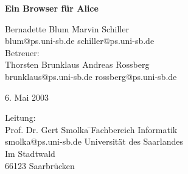 \documentclass[12pt,a4paper]{article}
\begin{document}

\begin{titlepage}

\vspace*{\fill}
\begin{center}
\LARGE{\bf{Ein Browser f\"{u}r Alice}}
\end{center}

\vspace{1cm}

\begin{center}
  \begin{minipage}[center]{10cm}
    \begin{tabbing} 
      Bernadette Blum \hspace{1cm}\= Marvin Schiller\\
      \small{blum@ps.uni-sb.de} \> \small{schiller@ps.uni-sb.de} \\[1cm]

      Betreuer: \\[2mm]
      Thorsten Brunklaus \> Andreas Rossberg \\
      \small{brunklaus@ps.uni-sb.de} \> \small{rossberg@ps.uni-sb.de}

    \end{tabbing}
  \end{minipage}
\end{center}

\vspace{5mm}
\begin{center}
\Large{6. Mai 2003}
\end{center}

\vspace{8mm}

\begin{center}
  \begin{minipage}[center]{15cm}
    \begin{tabbing}
     Leitung: \\
     Prof. Dr. Gert Smolka \hspace{1cm}\= \small Fachbereich Informatik \\ 
    \small{smolka@ps.uni-sb.de} \> \small Universit\"{a}t des Saarlandes\\ 
    \> \small Im Stadtwald \\
    \> \small  66123 Saarbr\"{u}cken \\[5mm]
    \end{tabbing}
  \end{minipage}
\end{center}


\end{titlepage}
\end{document}
